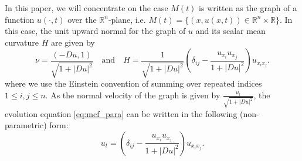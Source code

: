 \documentclass[12pt]{article}
\numberwithin{equation}{section}
\theoremstyle{plain}
\theoremstyle{definition}
\theoremstyle{remark}
\begin{document}
In this paper, we will concentrate on the case $M(t)$ is written as the graph of a function $u(\cdot ,t)$ over the $\mathbb{R}^n$-plane, i.e. 
$M(t) = \{ (x,u(x,t)) \in \mathbb{R}^n \times \mathbb{R} \}$. In this case, 
the unit upward normal for the graph of $u$ and its scalar mean curvature $H$ are given by
\begin{equation}
    \nu=\frac{(-Du,1)}{\sqrt{1+|Du|^2}}\quad\text{and}\quad
    H = \frac{1}{\sqrt{1+|Du|^2}} \left( \delta_{ij} -\frac{u_{x_i} u_{x_j}}{1+|Du|^2} \right) u_{x_i x_j}.
\end{equation}
where we use the Einstein convention of summing over repeated indices 
$1\leq i,j\leq n$.
As the normal velocity of the graph is given by $\frac{u_t}{\sqrt{1+|Du|^2}}$,  the evolution equation \eqref{eq:mcf_para} can be written in the following (non-parametric) form:
\begin{equation} \label{eq:mcf_nonpara}
    u_t =  \left( \delta_{ij} -\frac{u_{x_i} u_{x_j}}{1+|Du|^2} \right) u_{x_i x_j}.
\end{equation}
 
\end{document}
